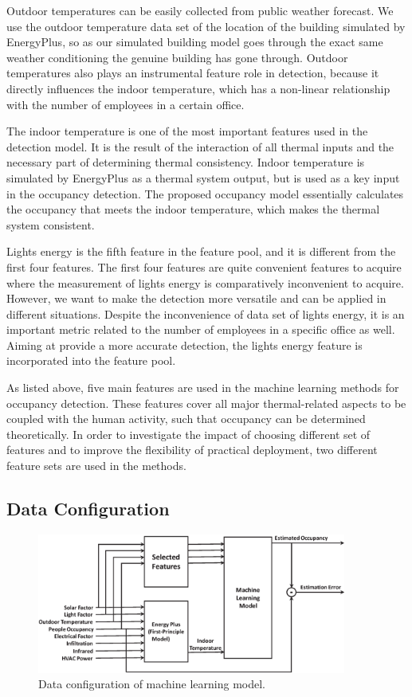 Outdoor temperatures can be easily collected from public weather forecast. We
use the outdoor temperature data set of the location of the building simulated
by EnergyPlus, so as our simulated building model goes through the exact same
weather conditioning the genuine building has gone through. Outdoor
temperatures also plays an instrumental feature role in detection, because it
directly influences the indoor temperature, which has a non-linear relationship
with the number of employees in a certain office.

The indoor temperature is one of the most important features used in the
detection model. It is the result of the interaction of all thermal inputs and
the necessary part of determining thermal consistency. Indoor temperature is
simulated by EnergyPlus as a thermal system output, but is used as a key input
in the occupancy detection. The proposed occupancy model essentially calculates
the occupancy that meets the indoor temperature, which makes the thermal system
consistent.

Lights energy is the fifth feature in the feature pool, and it is
different from the first four features. The first four features are quite
convenient features to acquire where the measurement of lights energy
is comparatively inconvenient to acquire. However, we want to make the
detection more versatile and can be applied in different situations.
Despite the inconvenience of data set of lights energy, it is an
important metric related to the number of employees in a specific office
as well. Aiming at provide a more accurate detection, the lights
energy feature is incorporated into the feature pool.

\textcolor{feb18rev}{As listed above, five main features are used in the
machine learning methods for occupancy detection.  These features cover all
major thermal-related aspects to be coupled with the human activity, such that
occupancy can be determined theoretically. In order to investigate the impact
of choosing different set of features and to improve the flexibility of
practical deployment, two different feature sets are used in the
methods.}

\subsection{Data Configuration}
\begin{figure}[!h]
\centering
\includegraphics[width=4in]{./Pics/FlowDiagram2.eps}
\caption{Data configuration of machine learning model.}
\label{fig:SVRFlow}
\end{figure}

